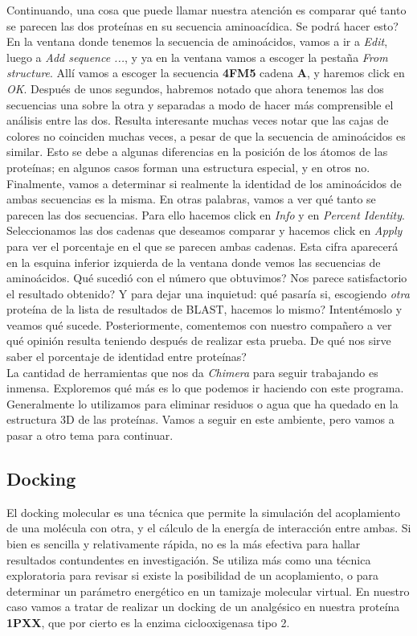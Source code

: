 \documentclass[10pt,letterpaper]{article}
\begin{document}
Continuando, una cosa que puede llamar nuestra atenci\'on es comparar qu\'e tanto se parecen las dos prote\'inas en su secuencia aminoac\'idica. Se podr\'a hacer esto? En la ventana donde tenemos la secuencia de amino\'acidos, vamos a ir a \emph{Edit}, luego a \emph{Add sequence ...}, y ya en la ventana vamos a escoger la pesta\~na \emph{From structure}. All\'i vamos a escoger la secuencia \textbf{4FM5} cadena \textbf{A}, y haremos click en \emph{OK}. Despu\'es de unos segundos, habremos notado que ahora tenemos las dos secuencias una sobre la otra y separadas a modo de hacer m\'as comprensible el an\'alisis entre las dos. Resulta interesante muchas veces notar que las cajas de colores no coinciden muchas veces, a pesar de que la secuencia de amino\'acidos es similar. Esto se debe a algunas diferencias en la posici\'on de los \'atomos de las prote\'inas; en algunos casos forman una estructura especial, y en otros no.\\

Finalmente, vamos a determinar si realmente la identidad de los amino\'acidos de ambas secuencias es la misma. En otras palabras, vamos a ver qu\'e tanto se parecen las dos secuencias. Para ello hacemos click en \emph{Info} y en \emph{Percent Identity}. Seleccionamos las dos cadenas que deseamos comparar y hacemos click en \emph{Apply} para ver el porcentaje en el que se parecen ambas cadenas. Esta cifra aparecer\'a en la esquina inferior izquierda de la ventana donde vemos las secuencias de amino\'acidos. Qu\'e sucedi\'o con el n\'umero que obtuvimos? Nos parece satisfactorio el resultado obtenido? Y para dejar una inquietud: qu\'e pasar\'ia si, escogiendo \emph{otra} prote\'ina de la lista de resultados de BLAST, hacemos lo mismo? Intent\'emoslo y veamos qu\'e sucede. Posteriormente, comentemos con nuestro compa\~nero a ver qu\'e opini\'on resulta teniendo despu\'es de realizar esta prueba. De qu\'e nos sirve saber el porcentaje de identidad entre prote\'inas?\\

La cantidad de herramientas que nos da \textit{Chimera} para seguir trabajando es inmensa. Exploremos qu\'e m\'as es lo que podemos ir haciendo con este programa. Generalmente lo utilizamos para eliminar residuos o agua que ha quedado en la estructura 3D de las prote\'inas. Vamos a seguir en este ambiente, pero vamos a pasar a otro tema para continuar.

\subsection{Docking}
El docking molecular es una t\'ecnica que permite la simulaci\'on del acoplamiento de una mol\'ecula con otra, y el c\'alculo de la energ\'ia de interacci\'on entre ambas. Si bien es sencilla y relativamente r\'apida, no es la m\'as efectiva para hallar resultados contundentes en investigaci\'on. Se utiliza m\'as como una t\'ecnica exploratoria para revisar si existe la posibilidad de un acoplamiento, o para determinar un par\'ametro energ\'etico en un tamizaje molecular virtual. En nuestro caso vamos a tratar de realizar un docking de un analg\'esico en nuestra prote\'ina \textbf{1PXX}, que por cierto es la enzima ciclooxigenasa tipo 2.\\
\end{document}
